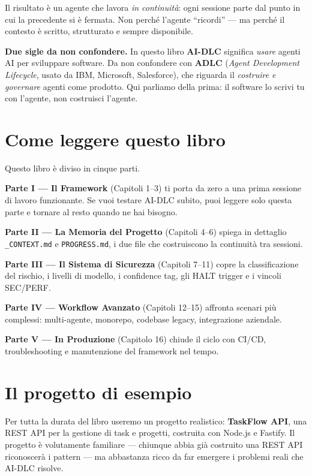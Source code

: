 Il risultato è un agente che lavora \textit{in continuità}: ogni sessione parte dal punto in cui la precedente si è fermata. Non perché l'agente ``ricordi'' --- ma perché il contesto è scritto, strutturato e sempre disponibile.

\begin{notebox}
\textbf{Due sigle da non confondere.} In questo libro \textbf{AI-DLC} significa \textit{usare} agenti AI per sviluppare software. Da non confondere con \textbf{ADLC} (\textit{Agent Development Lifecycle}, usato da IBM, Microsoft, Salesforce), che riguarda il \textit{costruire e governare} agenti come prodotto. Qui parliamo della prima: il software lo scrivi tu con l'agente, non costruisci l'agente.
\end{notebox}

\section*{Come leggere questo libro}

Questo libro è diviso in cinque parti.

\textbf{Parte I --- Il Framework} (Capitoli 1--3) ti porta da zero a una prima sessione di lavoro funzionante. Se vuoi testare AI-DLC subito, puoi leggere solo questa parte e tornare al resto quando ne hai bisogno.

\textbf{Parte II --- La Memoria del Progetto} (Capitoli 4--6) spiega in dettaglio \texttt{\_CONTEXT.md} e \texttt{PROGRESS.md}, i due file che costruiscono la continuità tra sessioni.

\textbf{Parte III --- Il Sistema di Sicurezza} (Capitoli 7--11) copre la classificazione del rischio, i livelli di modello, i confidence tag, gli HALT trigger e i vincoli SEC/PERF.

\textbf{Parte IV --- Workflow Avanzato} (Capitoli 12--15) affronta scenari più complessi: multi-agente, monorepo, codebase legacy, integrazione aziendale.

\textbf{Parte V --- In Produzione} (Capitolo 16) chiude il ciclo con CI/CD, troubleshooting e manutenzione del framework nel tempo.

\section*{Il progetto di esempio}

Per tutta la durata del libro useremo un progetto realistico: \textbf{TaskFlow API}, una REST API per la gestione di task e progetti, costruita con Node.js e Fastify. Il progetto è volutamente familiare --- chiunque abbia già costruito una REST API riconoscerà i pattern --- ma abbastanza ricco da far emergere i problemi reali che AI-DLC risolve.

